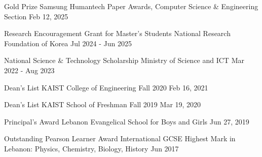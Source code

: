 \begin{cvhonors}
  \cvhonor
    {Gold Prize}
    {Samsung Humantech Paper Awards, Computer Science \& Engineering Section}
    { }
    {Feb 12, 2025}

  \cvhonor
    {Research Encouragement Grant for Master's Students}
    {National Research Foundation of Korea}
    { }
    {Jul 2024 - Jun 2025}

  \cvhonor
    {National Science \& Technology Scholarship}
    {Ministry of Science and ICT}
    { }
    {Mar 2022 - Aug 2023}

  \cvhonor
    {Dean's List}
    {KAIST College of Engineering}
    {Fall 2020}
    {Feb 16, 2021}

  \cvhonor
    {Dean's List}
    {KAIST School of Freshman}
    {Fall 2019}
    {Mar 19, 2020}

  \cvhonor
    {Principal's Award}
    {Lebanon Evangelical School for Boys and Girls}
    { }
    {Jun 27, 2019}

  \cvhonor
    {Outstanding Pearson Learner Award}
    {International GCSE Highest Mark in Lebanon: Physics, Chemistry, Biology, History}
    { }
    {Jun 2017}

\end{cvhonors}
